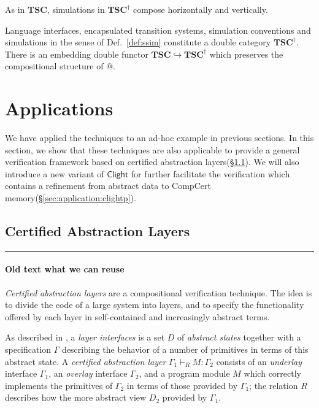 \documentclass[acmsmall,screen,review,anonymous]{acmart}
\newcommand{\kw}[1]{\ensuremath{ \mathsf{#1} }}
\begin{document}
As in $\mathbf{TSC}$,
simulations in $\mathbf{TSC}^\dagger$ compose
horizontally and vertically.

\begin{theorem} %
Language interfaces, encapsulated transition systems, simulation conventions
and simulations in the sense of Def.~\ref{def:ssim}
constitute a double category $\mathbf{TSC}^\dagger$.
There is an embedding double functor $\mathbf{TSC} \hookrightarrow \mathbf{TSC}^\dagger$
which preserves the compositional structure of $\mathbin@$.
\end{theorem}



\section{Applications} \label{sec:app} %

We have applied the techniques
to an ad-hoc example in previous sections.
In this section,
we show that these techniques are also applicable
to provide a general verification framework
based on certified abstraction layers(\S\ref{sec:application:cal}).
We will also introduce
a new variant of $\kw{Clight}$
for further facilitate
the verification which contains a refinement
from abstract data to CompCert memory(\S\ref{sec:application:clightp}).

\subsection{Certified Abstraction Layers} \label{sec:application:cal} %

\hrule

\paragraph{Old text what we can reuse}

\emph{Certified abstraction layers}
are a compositional verification technique.
The idea is to divide the code of a large system into layers,
and to specify the functionality offered by each layer
in self-contained and increasingly abstract terms.

As described in \citet{popl15},
a \emph{layer interfaces} is
a set $D$ of \emph{abstract states}
together with a specification $\Gamma$
describing the behavior of a number of primitives
in terms of this abstract state.
A \emph{certified abstraction layer}
$\Gamma_1 \vdash_R M : \Gamma_2$
consists of an \emph{underlay} interface $\Gamma_1$,
an \emph{overlay} interface $\Gamma_2$,
and a program module $M$
which correctly implements the primitives of $\Gamma_2$
in terms of those provided by $\Gamma_1$;
the relation $R$ describes
how the more abstract view $D_2$ provided by $\Gamma_1$.
\end{document}

